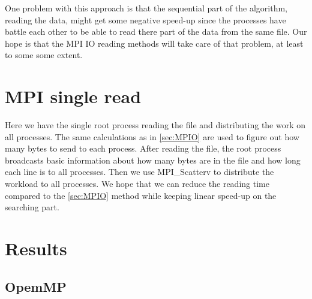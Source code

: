 \documentclass[a4paper,10pt]{article}
\begin{document}
  One problem with this approach is that the sequential part of the algorithm, reading the data,
  might get some negative speed-up since the processes have battle each other 
  to be able to read there part of the data from the same file.  Our hope is that
  the MPI IO reading methods will take care of that problem, at least to some some extent.   
  
\section{MPI single read}
  Here we have the single root process reading the file and distributing the work on all processes. 
  The same calculations as in \ref{sec:MPIO} are used to figure out how many bytes to send to each process.  
  After reading the file, the root process broadcasts basic information about how many bytes are in the 
  file and how long each line is to all processes. Then we use MPI\_Scatterv to distribute the workload 
  to all processes. We hope that we can reduce the reading time compared to the \ref{sec:MPIO} method while 
  keeping linear speed-up on the searching part.



\section{Results}

\subsection{OpemMP}
 
\end{document}
